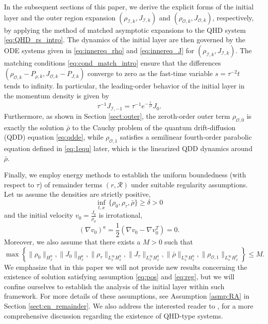 \documentclass[english]{amsart}
\theoremstyle{plain}
\theoremstyle{definition}
\theoremstyle{remark}
\theoremstyle{plain}
\theoremstyle{plain}
\theoremstyle{plain}
\numberwithin{equation}{section}
\begin{document}
In the subsequent sections of this paper, we derive the explicit forms of the initial layer and the outer region expansion $ (\rho_{\mathcal{I},k}, J_{\mathcal{I},k}) $ and $ (\rho_{\mathcal{O},k}, J_{\mathcal{O},k}) $, respectively, by applying the method of matched asymptotic expansions \cite{CK} to the QHD system \eqref{eq:QHD_rs_intro}. The dynamics of the initial layer are then governed by the ODE systems given in \eqref{eq:innereq_rho} and \eqref{eq:innereq_J} for $ (\rho_{\mathcal{I},k}, J_{\mathcal{I},k}) $. The matching conditions \eqref{eq:cond_match_intro} ensure that the differences $ (\rho_{\mathcal{O},k} - P_{\rho,k}, J_{\mathcal{O},k} - P_{J,k}) $ converge to zero as the fast-time variable $ s = \tau^{-2}t $ tends to infinity. In particular, the leading-order behavior of the initial layer in the momentum density is given by
\[
\tau^{-1}J_{\mathcal{I},-1} = \tau^{-1} e^{-\frac{t}{\tau^2}} J_0.
\]
Furthermore, as shown in Section \ref{sect:outer}, the zeroth-order outer term $ \rho_{\mathcal{O},0} $ is exactly the solution $\bar\rho$ to the Cauchy problem of the quantum drift-diffusion (QDD) equation \eqref{eq:qdde}, while $ \rho_{\mathcal{O},1} $ satisfies a semilinear fourth-order parabolic equation defined in \eqref{eq:1equ} later, which is the linearized QDD dynamics around $\bar\rho$. 

Finally, we employ energy methods to establish the uniform boundedness (with respect to $ \tau $) of remainder terms $ (r, \mathcal{R}) $ under suitable regularity assumptions. Let us assume the densities are strictly positive,
\begin{equation}\label{eq:pos}
\inf_{t,x}\,\{\rho_0,\rho_\tau,\bar\rho\}\geq\delta >0
\end{equation}
and the initial velocity $v_0=\frac{J_0}{\rho_0}$ is irrotational,
\begin{equation}\label{eq:irr}
(\nabla v_0)^a=\frac12\left(\nabla v_0-\nabla v_0^T\right)=0.
\end{equation}
Moreover, we also assume that there exists a $M>0$ such that 
\begin{equation}\label{eq:reg}
\max\left\{\|\rho_0\|_{H^{9}_x},\|J_0\|_{H^{8}_x},\|\rho_\tau\|_{L^\infty_x H^{9}_x},\|J_\tau\|_{L^\infty_x H^{8}_x},\|\bar\rho\|_{L^\infty_x H^{9}_x},\|\rho_{\mathcal{O},1}\|_{L^\infty_x H^{7}_x}\right\}\leq M.
\end{equation}
We emphasize that in this paper we will not provide new results concerning the existence of solution satisfying assumption \eqref{eq:pos} and \eqref{eq:reg}, but we will confine ourselves to establish the analysis of the initial layer within such framework. For more details of these assumptions, see Assumption \ref{asmp:RA} in Section \ref{sect:en_remainder}. We also address the interested reader to \cite{AMZ1, AM_K}, for a more comprehensive discussion regarding the existence of QHD-type systems.
\end{document}
